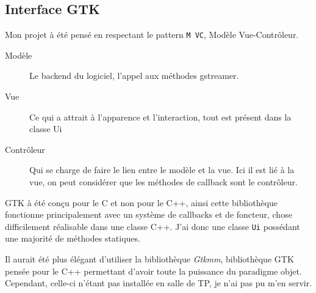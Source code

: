 \documentclass[a4paper, 11pt]{article}
\begin{document}
	\subsection{Interface GTK}
	Mon projet à été pensé en respectant le pattern \texttt{M VC}, Modèle Vue-Contrôleur.

	\begin{description}
		\item[Modèle] Le backend du logiciel, l'appel aux méthodes gstreamer.
		\item[Vue] Ce qui a attrait à l'apparence et l'interaction, tout est présent dans la classe Ui
		\item[Contrôleur] Qui se charge de faire le lien entre le modèle et la vue. Ici il est lié à la vue, on peut considérer que les méthodes de callback sont
			le contrôleur.
	\end{description}

	\begin{remarque}
		GTK à été conçu pour le C et non pour le C++, ainsi cette bibliothèque fonctionne principalement avec un système de callbacks et de foncteur, chose
		difficilement réalisable dans une classe C++. J'ai donc une classe \texttt{Ui} possédant une majorité de méthodes statiques. 

		Il aurait été plus élégant d'utiliser la bibliothèque \textit{Gtkmm}, bibliothèque GTK pensée pour le C++ permettant d'avoir toute la puissance du
		paradigme objet. Cependant, celle-ci n'étant pas installée en salle de TP, je n'ai pas pu m'en servir.
	\end{remarque}
\end{document}
